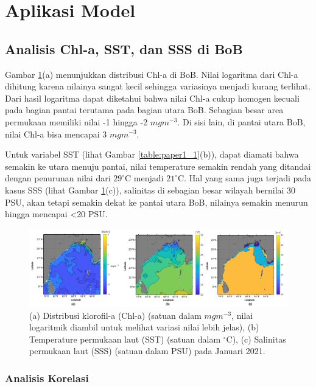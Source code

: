 \section[Aplikasi Model]{Aplikasi Model}
\begin{spacing}{1.5}
	\vspace{-1pc}
\subsection[Analisis Chl-a, SST, dan SSS di BoB]{Analisis Chl-a, SST, dan SSS di BoB}
	Gambar \ref{fig:paper1_1}(a) menunjukkan distribusi Chl-a di BoB. Nilai logaritma dari Chl-a dihitung karena nilainya sangat kecil sehingga variasinya menjadi kurang terlihat. Dari hasil logaritma dapat diketahui bahwa nilai Chl-a cukup homogen kecuali pada bagian pantai terutama pada bagian utara BoB. Sebagian besar area permukaan memiliki nilai -1 hingga -2 $mgm^{-3}$. Di sisi lain, di pantai utara BoB, nilai Chl-a bisa mencapai 3 $mgm^{-3}$.
	
	Untuk variabel SST (lihat Gambar \ref{table:paper1_1}(b)), dapat diamati bahwa semakin ke utara menuju pantai, nilai temperature semakin rendah yang ditandai dengan penurunan nilai dari $29^\circ$C menjadi $21^\circ$C. Hal yang sama juga terjadi pada kasus SSS (lihat Gambar \ref{fig:paper1_1}(c)), salinitas di sebagian besar wilayah bernilai 30 PSU, akan tetapi semakin dekat ke pantai utara BoB, nilainya semakin menurun hingga mencapai <20 PSU.
	
	\begin{figure}[H]
		\centering
		\includegraphics[width=15cm]{contents/final_figure_paper1/gambar_1}
		\caption{(a) Distribusi klorofil-a (Chl-a) (satuan dalam $mgm^{-3}$, nilai logaritmik diambil untuk melihat variasi nilai lebih jelas), (b) Temperature permukaan laut (SST) (satuan dalam $^\circ$C), (c) Salinitas permukaan laut (SSS) (satuan dalam PSU) pada Januari 2021.}
		\label{fig:paper1_1}
	\end{figure}
\subsubsection[Analisis Korelasi]{Analisis Korelasi}
	

\end{spacing}
